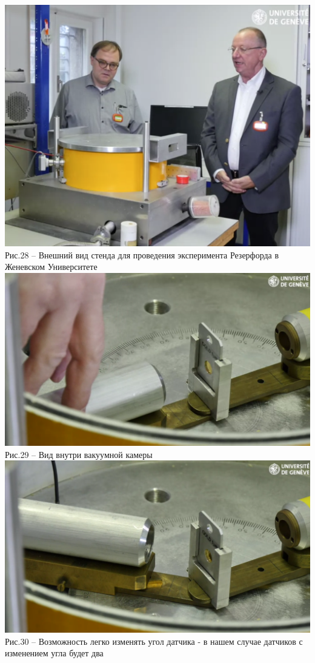 \documentclass[11pt]{report}
\begin{document}
\includegraphics[scale=0.3]{ust_a_3}\\
Рис.28 -- Внешний вид стенда для проведения эксперимента Резерфорда в Женевском Университете\\

\includegraphics[scale=0.22]{ust_a_4}\\
Рис.29 -- Вид внутри вакуумной камеры\\

\includegraphics[scale=0.22]{ust_a_5}\\
Рис.30 -- Возможность легко изменять угол датчика - в нашем случае датчиков с изменением угла будет два\\
\end{document}
